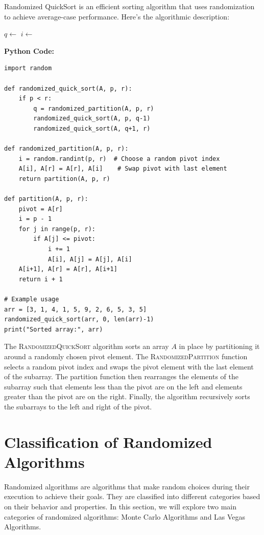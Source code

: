 \documentclass[12pt]{book} %
\begin{document}
Randomized QuickSort is an efficient sorting algorithm that uses randomization to achieve average-case performance. Here's the algorithmic description:
\FloatBarrier
\begin{algorithm}
\caption{Randomized QuickSort}
\begin{algorithmic}[1]
        \State $q \gets $ 
        \State {}
        \State {}
    \EndIf
\EndFunction
{}
    \State $i \gets$  
    \State {} 
    \State \Return {}
\EndFunction
\end{algorithmic}
\end{algorithm}
\FloatBarrier
\textbf{Python Code:}
\FloatBarrier
\begin{lstlisting}
import random

def randomized_quick_sort(A, p, r):
    if p < r:
        q = randomized_partition(A, p, r)
        randomized_quick_sort(A, p, q-1)
        randomized_quick_sort(A, q+1, r)

def randomized_partition(A, p, r):
    i = random.randint(p, r)  # Choose a random pivot index
    A[i], A[r] = A[r], A[i]    # Swap pivot with last element
    return partition(A, p, r)

def partition(A, p, r):
    pivot = A[r]
    i = p - 1
    for j in range(p, r):
        if A[j] <= pivot:
            i += 1
            A[i], A[j] = A[j], A[i]
    A[i+1], A[r] = A[r], A[i+1]
    return i + 1

# Example usage
arr = [3, 1, 4, 1, 5, 9, 2, 6, 5, 3, 5]
randomized_quick_sort(arr, 0, len(arr)-1)
print("Sorted array:", arr)
\end{lstlisting}
\FloatBarrier
The \textsc{RandomizedQuickSort} algorithm sorts an array \(A\) in place by partitioning it around a randomly chosen pivot element. The \textsc{RandomizedPartition} function selects a random pivot index and swaps the pivot element with the last element of the subarray. The partition function then rearranges the elements of the subarray such that elements less than the pivot are on the left and elements greater than the pivot are on the right. Finally, the algorithm recursively sorts the subarrays to the left and right of the pivot.


\section{Classification of Randomized Algorithms}
Randomized algorithms are algorithms that make random choices during their execution to achieve their goals. They are classified into different categories based on their behavior and properties. In this section, we will explore two main categories of randomized algorithms: Monte Carlo Algorithms and Las Vegas Algorithms.
\end{document}
